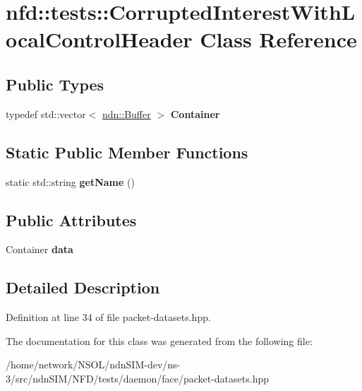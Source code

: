 \hypertarget{classnfd_1_1tests_1_1CorruptedInterestWithLocalControlHeader}{}\section{nfd\+:\+:tests\+:\+:Corrupted\+Interest\+With\+Local\+Control\+Header Class Reference}
\label{classnfd_1_1tests_1_1CorruptedInterestWithLocalControlHeader}
\subsection*{Public Types}
\begin{DoxyCompactItemize}
\item 
typedef std\+::vector$<$ \hyperlink{classndn_1_1Buffer}{ndn\+::\+Buffer} $>$ {\bfseries Container}\hypertarget{classnfd_1_1tests_1_1CorruptedInterestWithLocalControlHeader_ab5c0d8cd3459b9da3c21037ae64f4e26}{}\label{classnfd_1_1tests_1_1CorruptedInterestWithLocalControlHeader_ab5c0d8cd3459b9da3c21037ae64f4e26}

\end{DoxyCompactItemize}
\subsection*{Static Public Member Functions}
\begin{DoxyCompactItemize}
\item 
static std\+::string {\bfseries get\+Name} ()\hypertarget{classnfd_1_1tests_1_1CorruptedInterestWithLocalControlHeader_adbffaa5cdfe7f792b71313fba65d4099}{}\label{classnfd_1_1tests_1_1CorruptedInterestWithLocalControlHeader_adbffaa5cdfe7f792b71313fba65d4099}

\end{DoxyCompactItemize}
\subsection*{Public Attributes}
\begin{DoxyCompactItemize}
\item 
Container {\bfseries data}\hypertarget{classnfd_1_1tests_1_1CorruptedInterestWithLocalControlHeader_adcf73b727c3366c586253a3f365f84f4}{}\label{classnfd_1_1tests_1_1CorruptedInterestWithLocalControlHeader_adcf73b727c3366c586253a3f365f84f4}

\end{DoxyCompactItemize}


\subsection{Detailed Description}


Definition at line 34 of file packet-\/datasets.\+hpp.



The documentation for this class was generated from the following file\+:\begin{DoxyCompactItemize}
\item 
/home/network/\+N\+S\+O\+L/ndn\+S\+I\+M-\/dev/ns-\/3/src/ndn\+S\+I\+M/\+N\+F\+D/tests/daemon/face/packet-\/datasets.\+hpp\end{DoxyCompactItemize}
